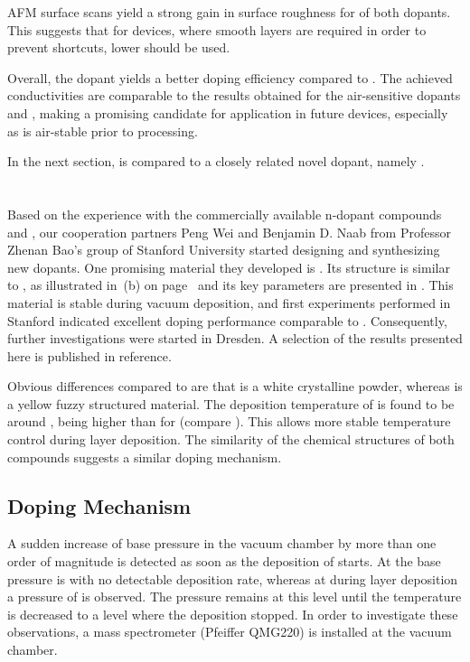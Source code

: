 AFM surface scans yield a strong gain in surface roughness for  of both dopants. This suggests that for devices, where smooth layers are required in order to prevent shortcuts, lower \CLongs should be used.

Overall, the dopant \dmbi yields a better doping efficiency compared to \aob. The achieved conductivities are comparable to the results obtained for the air-sensitive dopants \CrPd and \WPd, making \dmbi a promising candidate for application in future devices, especially as \dmbi is air-stable prior to processing.

In the next section, \dmbi is compared to a closely related novel dopant, namely \meodmbiI.

\newpage
\section{\texorpdfstring{\meodmbiI}{o-MeO-DMBI-I}}
\label{sec:ResMeO-DMBI}
Based on the experience with the commercially available n-dopant compounds \Ndmbi and \dmbi, our cooperation partners Peng Wei and Benjamin D. Naab from Professor Zhenan Bao's group of Stanford University started designing and synthesizing new dopants. One promising material they developed is \meodmbiI. Its structure is similar to \dmbi, as illustrated in \,(b) on page~\pageref{fig:mat} and its key parameters are presented in . This material is stable during vacuum deposition, and first experiments performed in Stanford indicated excellent doping performance comparable to \dmbi. Consequently, further investigations were started in Dresden.
A selection of the results presented here is published in reference\cite{Wei2012}.

Obvious differences compared to \dmbi are that \meodmbiI is a white crystalline powder, whereas \dmbi is a yellow fuzzy structured material. The deposition temperature of \meodmbiI is found to be around \Tdep[185], being  higher than for \dmbi (compare ). This allows more stable temperature control during layer deposition. The similarity of the chemical structures of both compounds suggests a similar doping mechanism.

\subsection{Doping Mechanism}\label{sec:AS-DMBIs-DopingMech}
A sudden increase of base pressure in the vacuum chamber by more than one order of magnitude is detected as soon as the deposition of \meodmbiI starts. At \T[100] the base pressure is  with no detectable deposition rate, whereas at \T[185] during layer deposition a pressure of  is observed. The pressure remains at this level until the temperature is decreased to a level where the deposition stopped. In order to investigate these observations, a mass spectrometer (Pfeiffer QMG220) is installed at the vacuum chamber.

